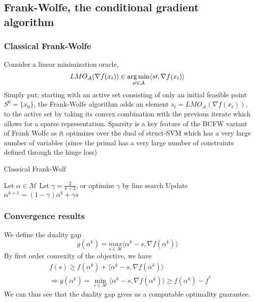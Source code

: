 \subsection{Frank-Wolfe, the conditional gradient algorithm}
\subsubsection*{Classical Frank-Wolfe}
Consider a linear minimization oracle,
\begin{equation}
    LMO_{\mathcal{A}}(\nabla f(x_{t}))\in
    \operatorname*{\arg\min}_{s\prime\in\mathcal{A}}\langle s\prime, \nabla f(x_{t})\rangle
    \label{eq:lmo}
\end{equation}
Simply put; starting with an active set consisting of only an initial feasible
point $S^{0}= \{x_{0}\}$, the Frank-Wolfe algorithm adds an element $s_{t}=
LMO_{\mathcal{A}}(\nabla f(x_{t}))$, to the active set by taking its
convex combination with the previous iterate which allows for a sparse
representation. Sparsity is a key feature of the BCFW variant of Frank Wolfe as
it optimizes over the dual of struct-SVM which has a very large number of
variables (since the primal has a very large number of constraints defined
through the hinge loss)
\begin{algorithm}
  \caption{Classical Frank-Wolf}
  \label{alg:fw}
\begin{algorithmic}
   \STATE Let $\alpha\in\mathcal{M}$
   \STATE Let $\gamma = \frac{2}{k+2}$, or optimize $\gamma$ by line search
   \STATE Update $\alpha^{k+1}= (1-\gamma)\alpha^{k}+ \gamma s$
   \ENDFOR
\end{algorithmic}
\end{algorithm}

\subsubsection*{Convergence results}
We define the duality gap
\begin{equation}
    g(\alpha^{k})= \underset{s\in\mathcal{M}}{\textit{max}}\langle \alpha^{k}-s, \nabla f(\alpha^{k})\rangle
\end{equation}
By first order convexity of the objective, we have
\begin{align}
    &f(s)\geq f(\alpha^{k})+ \langle \alpha^{k}-s, \nabla f(\alpha^{k})\rangle\\
    &\Longrightarrow g(\alpha^{k})=
      \min_{s\in\mathcal{M}}\langle \alpha^{k}-s, \nabla
      f(\alpha^{k})\rangle \geq f(\alpha^{k})- f^{*}
\end{align}
We can thus see that the duality gap gives us a computable optimality guarantee. \\

